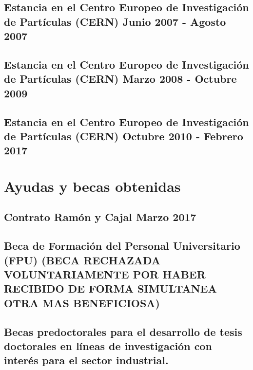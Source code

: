 \documentclass[a4paper, 11pt, twoside, openright]{report}
\begin{document}
\subsection{Estancia en el Centro Europeo de Investigación de Partículas (CERN) Junio 2007 - Agosto 2007}

\subsection{Estancia en el Centro Europeo de Investigación de Partículas (CERN) Marzo 2008 - Octubre 2009}

\subsection{Estancia en el Centro Europeo de Investigación de Partículas (CERN) Octubre 2010 - Febrero 2017}



\section{Ayudas y becas obtenidas}
\subsection{Contrato Ramón y Cajal Marzo 2017}

\subsection{Beca de Formación del Personal Universitario (FPU) (BECA RECHAZADA VOLUNTARIAMENTE POR HABER RECIBIDO DE FORMA SIMULTANEA OTRA MAS BENEFICIOSA)}

\subsection{Becas predoctorales para el desarrollo de tesis doctorales en líneas de investigación con interés para el sector industrial.}

\end{document}
